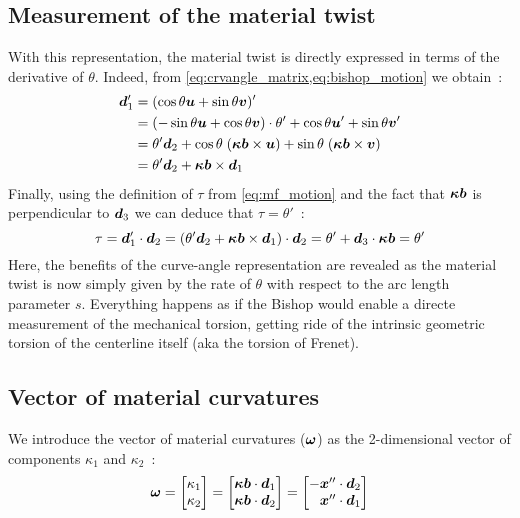 \subsection{Measurement of the material twist}
With this  representation, the material twist is directly expressed in terms of the derivative of $\theta$. Indeed, from \cref{eq:crvangle_matrix,eq:bishop_motion} we obtain~:
\begin{equation}
	\begin{aligned}
		\boldsymbol{d}'_1
			&= (\cos{\theta} \boldsymbol{u} + \sin{\theta}\boldsymbol{v})' \\
			& = (-\sin{\theta} \boldsymbol{u} + \cos{\theta}\boldsymbol{v})\cdot \theta' +  \cos{\theta} \boldsymbol{u}' + \sin{\theta}\boldsymbol{v}' \\
			& = \theta' \boldsymbol{d}_2 + \cos{\theta}\; (\boldsymbol{\kappa b} \times \boldsymbol{u}) + \sin{\theta}\; (\boldsymbol{\kappa b} \times \boldsymbol{v})\\
			& = \theta' \boldsymbol{d}_2 + \boldsymbol{\kappa b} \times \boldsymbol{d}_1\\
	\end{aligned}
\end{equation}
Finally, using the definition of $\tau$ from \cref{eq:mf_motion} and the fact that $\boldsymbol{\kappa b}$ is perpendicular to $\boldsymbol{d}_3$ we can deduce that $\tau=\theta'$~:
\begin{equation}
	\tau = \boldsymbol{d}'_1 \cdot \boldsymbol{d}_2 = (\theta'\boldsymbol{d}_2 + \boldsymbol{\kappa b}\times\boldsymbol{d}_1)\cdot \boldsymbol{d}_2 = \theta' + \boldsymbol{d}_3\cdot\boldsymbol{\kappa b} = \theta'
\label{eq:thetatau}
\end{equation}
Here, the benefits of the curve-angle representation are revealed as the material twist is now simply given by the rate of $\theta$ with respect to the arc length parameter $s$. Everything happens as if the Bishop would enable a directe measurement of the mechanical torsion, getting ride of the intrinsic geometric torsion of the centerline itself (aka the torsion of Frenet).
\subsection{Vector of material curvatures}
We introduce the vector of material curvatures ($\boldsymbol{\omega}$) as the 2-dimensional vector of components $\kappa_1$ and $\kappa_2$~:
\begin{equation}
	\vect{\omega} =
	\begin{bmatrix*}[r]
		\kappa_1\\
		\kappa_2\\
	\end{bmatrix*} =
	\begin{bmatrix}
		\vect{\kappa b}\cdot\vect{d}_1\\
		\vect{\kappa b}\cdot\vect{d}_2\\
	\end{bmatrix} =
	\begin{bmatrix*}[r]
		-\vect{x}''\cdot\vect{d}_2\\
		\vect{x}''\cdot\vect{d}_1\\
	\end{bmatrix*}
\end{equation}

